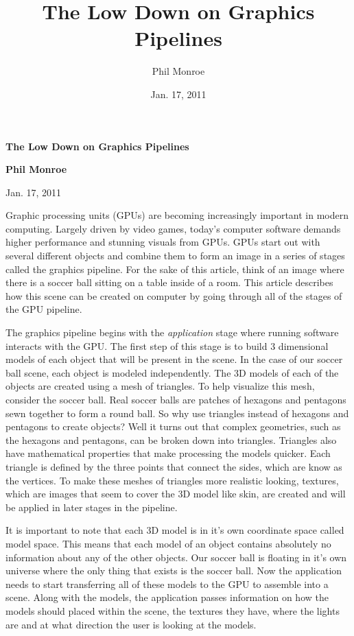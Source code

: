 \documentclass[12pt] {article}
\begin{document}
\title{The Low Down on Graphics Pipelines}
\author{Phil Monroe}
\date{Jan. 17, 2011}

\centerline{
	\Large \bf The Low Down on Graphics Pipelines} %


\centerline{\bf Phil Monroe}

\centerline{Jan. 17, 2011}

\bigskip

Graphic processing units (GPUs) are becoming increasingly important in modern computing. Largely driven by video games, today's computer software  demands higher performance and stunning visuals from GPUs. GPUs start out with several different objects and combine them to form an image in a series of stages called the graphics pipeline. For the sake of this article, think of an image where there is a soccer ball sitting on a table inside of a room. This article describes how this scene can be created on computer by going through all of the stages of the GPU pipeline.

The graphics pipeline begins with the \emph{application} stage where running software interacts with the GPU. The first step of this stage is to build 3 dimensional models of each object that will be present in the scene. In the case of our soccer ball scene, each object is modeled independently. The 3D models of each of the objects are created using a mesh of triangles. To help visualize this mesh, consider the soccer ball. Real soccer balls are patches of hexagons and pentagons sewn together to form a round ball. So why use triangles instead of hexagons and pentagons to create objects? Well it turns out that complex geometries, such as the hexagons and pentagons, can be broken down into triangles. Triangles also have mathematical properties that make processing the models quicker. Each triangle is defined by the three points that connect the sides, which are know as the vertices. To make these meshes of triangles more realistic looking, textures, which are images that seem to cover the 3D model like skin, are created and will be applied in later stages in the pipeline.

It is important to note that each 3D model is in it's own coordinate space called model space. This means that each model of an object contains absolutely no information about any of the other objects. Our soccer ball is floating in it's own universe where the only thing that exists is the soccer ball. Now the application needs to start transferring all of these models to the GPU to assemble into a scene. Along with the models, the application passes information on how the models should placed within the scene, the textures they have, where the lights are and at what direction the user is looking at the models.
\end{document}
